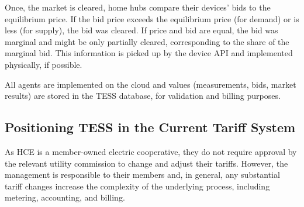 Once, the market is cleared, home hubs compare their devices' bids to the equilibrium price. If the bid price exceeds the equilibrium price (for demand) or is less (for supply), the bid was cleared. 
If price and bid are equal, the bid was marginal and might be only partially cleared, corresponding to the share of the marginal bid.
This information is picked up by the device API and implemented physically, if possible.

All agents are implemented on the cloud and values (measurements, bids, market results) are stored in the TESS database, for validation and billing purposes.

\subsection{Positioning TESS in the Current Tariff System}\label{sec:position_tariff_system}

As HCE is a member-owned electric cooperative, they do not require approval by the relevant utility commission to change and adjust their tariffs. However, the management is responsible to their members and, in general, any substantial tariff changes increase the complexity of the underlying process, including metering, accounting, and billing. 


